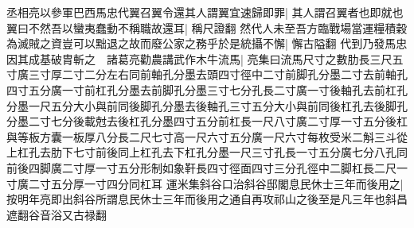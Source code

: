 丞相亮以參軍巴西馬忠代翼召翼令還其人謂翼宜速歸即罪|{
	其人謂召翼者也即就也}
翼曰不然吾以蠻夷蠢動不稱職故還耳|{
	稱尺證翻}
然代人未至吾方臨戰場當運糧積穀為滅賊之資豈可以黜退之故而廢公家之務乎於是統攝不懈|{
	懈古隘翻}
代到乃發馬忠因其成基破胄斬之　諸葛亮勸農講武作木牛流馬|{
	亮集曰流馬尺寸之數肋長三尺五寸廣三寸厚二寸二分左右同前軸孔分墨去頭四寸徑中二寸前脚孔分墨二寸去前軸孔四寸五分廣一寸前杠孔分墨去前脚孔分墨三寸七分孔長二寸廣一寸後軸孔去前杠孔分墨一尺五分大小與前同後脚孔分墨去後軸孔三寸五分大小與前同後杠孔去後脚孔分墨二寸七分後載尅去後杠孔分墨四寸五分前杠長一尺八寸廣二寸厚一寸五分後杠與等板方囊一板厚八分長二尺七寸高一尺六寸五分廣一尺六寸每枚受米二斛三斗從上杠孔去肋下七寸前後同上杠孔去下杠孔分墨一尺三寸孔長一寸五分廣七分八孔同前後四脚廣二寸厚一寸五分形制如象靬長四寸徑面四寸三分孔徑中二脚杠長二尺一寸廣二寸五分厚一寸四分同杠耳}
運米集斜谷口治斜谷邸閣息民休士三年而後用之|{
	按明年亮即出斜谷所謂息民休士三年而後用之通自再攻祁山之後至是凡三年也斜昌遮翻谷音浴又古禄翻}



